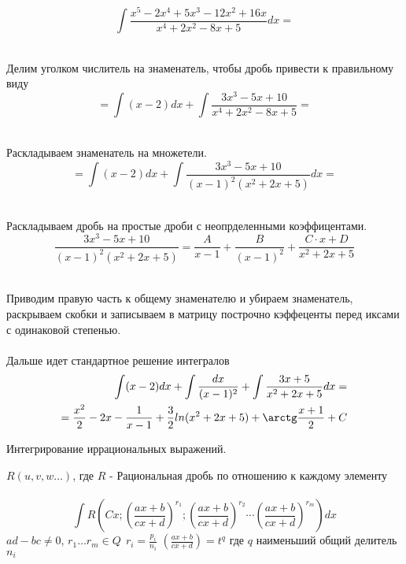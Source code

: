 \begin{center}
  \\
\end{center}

\[\int \frac{x^5 - 2x^4 + 5x^3 - 12x^2 + 16x}{x^4 + 2x^2 - 8x + 5} dx = \]

\\
Делим уголком числитель на знаменатель, чтобы дробь привести к правильному виду
\[= \int (x - 2)dx + \int \frac{3x^3 - 5x + 10}{x^4 + 2x^2 - 8x + 5} = \]

\\
Раскладываем знаменатель на множетели.
\[= \int (x - 2)dx + \int \frac{3x^3 - 5x + 10}{(x-1)^2 (x^2+2x+5)} dx = \]

\\
Раскладываем дробь на простые дроби с неопрделенными коэффицентами.
\[
  \frac{3x^3 - 5x + 10}{(x-1)^2 (x^2+2x+5)} = \frac{A}{x - 1} +
  \frac{B}{(x - 1)^2} + \frac{C \cdot x + D}{x^2 + 2x + 5}
\]

\\
Приводим правую часть к общему знаменателю и убираем знаменатель, раскрываем
скобки и записываем в матрицу построчно кэффеценты перед иксами с одинаковой
степенью.\\

\\
Дальше идет стандартное решение интегралов
\begin{eqnarray*}
  \int (x - 2)dx + \int \frac{dx}{(x - 1)^2} + \int \frac{3x + 5}{x^2 + 2x + 5}
    dx = \\
  =\frac{x^2}{2} - 2x - \frac{1}{x-1} + \frac{3}{2} ln(x^2 + 2x + 5) + \arctg
    \frac{x + 1}{2} + C
\end{eqnarray*}

\begin{title}[\Large]
  Интегрирование иррациональных выражений.
\end{title}

$R(u, v, w \ldots)$, где $R$ - Рациональная дробь по отношению к каждому
элементу\\

\\
\[
\int R \left( Cx; \left( \frac{ax + b}{cx + d} \right)^{r_1};
\left( \frac{ax + b}{cx + d} \right)^{r_2} \cdots
\left( \frac{ax + b}{cx + d} \right)^{r_m} \right)dx
\]
$ad - bc \neq 0$, $r_1 \ldots r_m\in Q ~~ r_i = \frac{p_i}{n_i}$
$\left( \frac{ax + b}{cx + d} \right) = t^q$ где $q$ наименьший общий делитель
  $n_i$\\

